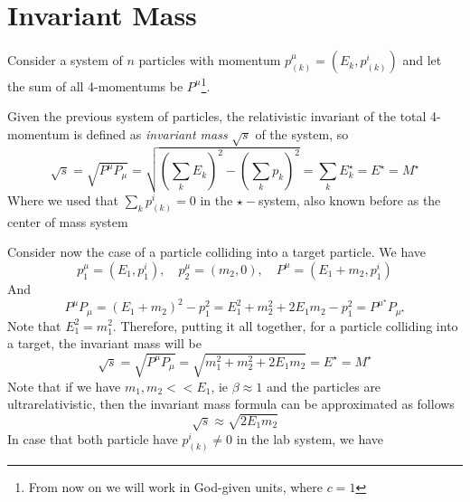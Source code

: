 \documentclass[../admech.tex]{subfiles}
\begin{document}
\section{Invariant Mass}
Consider a system of $n$ particles with momentum $p^\mu_{(k)}=(E_k,p^i_{(k)})$ and let the sum of all 4-momentums be $P^\mu$\footnote{From now on we will work in God-given units, where $c=1$}.
\begin{dfn}
	Given the previous system of particles, the relativistic invariant of the total 4-momentum is defined as \emph{invariant mass} $\sqrt{s}$ of the system, so
	\begin{equation}
		\sqrt{s}=\sqrt{P^\mu P_\mu}=\sqrt{\left( \sum_kE_k \right)^2-\left( \sum_kp_k \right)^2}=\sum_kE_k^\star=E^\star=M^\star
		\label{eq:roots}
	\end{equation}
	Where we used that $\sum_kp_{(k)}^i=0$ in the $\star-$system, also known before as the center of mass system
\end{dfn}
Consider now the case of a particle colliding into a target particle. We have
\begin{equation}
	p^\mu_1=\left( E_1,p_1^i \right),\quad p^\mu_2=\left( m_2,0 \right),\quad P^\mu=\left( E_1+m_2,p_1^i \right)
	\label{eq:4momtarcol}
\end{equation}
And
\begin{equation}
	P^\mu P_\mu=\left( E_1+m_2 \right)^2-p_1^2=E_1^2+m_2^2+2E_1m_2-p_1^2=P^{\mu^\star}P_{\mu^\star}
	\label{eq:s4tarcol}
\end{equation}
Note that $E_1^2=m_1^2$.
Therefore, putting it all together, for a particle colliding into a target, the invariant mass will be
\begin{equation}
	\sqrt{s}=\sqrt{P^\mu P_\mu}=\sqrt{m_1^2+m_2^2+2E_1m_2}=E^\star=M^\star
	\label{eq:invmasstarcol}
\end{equation}
Note that if we have $m_1,m_2<<E_1$, ie $\beta\approx1$ and the particles are ultrarelativistic, then the invariant mass formula can be approximated as follows
\begin{equation}
	\sqrt{s}\approx\sqrt{2E_1m_2} %
	\label{eq:invmasstarcolapprox}
\end{equation}
In case that both particle have $p^i_{(k)}\ne0$ in the lab system, we have
\end{document}

